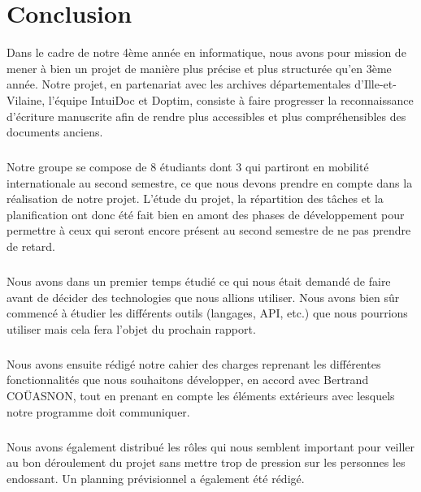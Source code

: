 \chapter{Conclusion}

Dans le cadre de notre 4ème année en informatique, nous avons pour mission de
mener à bien un projet de manière plus précise et plus structurée qu’en 3ème année.
Notre projet, en partenariat avec les archives départementales d’Ille-et-Vilaine,
l’équipe IntuiDoc et Doptim, consiste à faire progresser la reconnaissance d’écriture
manuscrite afin de rendre plus accessibles et plus compréhensibles des documents anciens.

\paragraph{}
Notre groupe se compose de 8 étudiants dont 3 qui partiront en mobilité internationale
au second semestre, ce que nous devons prendre en compte dans la réalisation de notre
projet. L’étude du projet, la répartition des tâches et la planification ont donc été
fait bien en amont des phases de développement pour permettre à ceux qui seront encore
présent au second semestre de ne pas prendre de retard.

\paragraph{}
Nous avons dans un premier temps étudié ce qui nous était demandé de faire avant de
décider des technologies que nous allions utiliser. Nous avons bien sûr commencé à
étudier les différents outils (langages, API, etc.) que nous pourrions utiliser mais
cela fera l’objet du prochain rapport.

\paragraph{}
Nous avons ensuite rédigé notre cahier des charges reprenant les différentes fonctionnalités
que nous souhaitons développer, en accord avec Bertrand COÜASNON, tout en prenant en compte
les éléments extérieurs avec lesquels notre programme doit communiquer.

\paragraph{}
Nous avons également distribué les rôles qui nous semblent important pour veiller au bon
déroulement du projet sans mettre trop de pression sur les personnes les endossant.
Un planning prévisionnel a également été rédigé.
